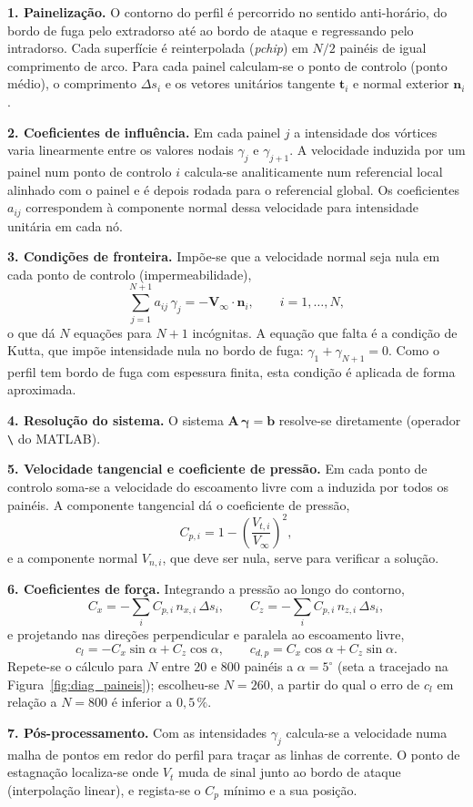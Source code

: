 \noindent\textbf{1. Painelização.} O contorno do perfil é percorrido no sentido
anti-horário, do bordo de fuga pelo extradorso até ao bordo de ataque e
regressando pelo intradorso. Cada superfície é reinterpolada (\emph{pchip}) em
$N/2$ painéis de igual comprimento de arco. Para cada painel calculam-se o ponto
de controlo (ponto médio), o comprimento $\Delta s_i$ e os vetores unitários
tangente $\mathbf{t}_i$ e normal exterior $\mathbf{n}_i$.

\noindent\textbf{2. Coeficientes de influência.} Em cada painel $j$ a intensidade dos
vórtices varia linearmente entre os valores nodais $\gamma_j$ e $\gamma_{j+1}$.
A velocidade induzida por um painel num ponto de controlo $i$ calcula-se
analiticamente num referencial local alinhado com o painel e é depois rodada para
o referencial global. Os coeficientes $a_{ij}$ correspondem à componente normal
dessa velocidade para intensidade unitária em cada nó.

\noindent\textbf{3. Condições de fronteira.} Impõe-se que a velocidade normal seja nula em
cada ponto de controlo (impermeabilidade),
\[
  \sum_{j=1}^{N+1} a_{ij}\,\gamma_j = -\mathbf{V}_\infty \cdot \mathbf{n}_i ,
  \qquad i = 1,\dots,N ,
\]
o que dá $N$ equações para $N+1$ incógnitas. A equação que falta é a condição de
Kutta, que impõe intensidade nula no bordo de fuga:
$\gamma_1 + \gamma_{N+1} = 0$. Como o perfil tem bordo de fuga com espessura
finita, esta condição é aplicada de forma aproximada.

\noindent\textbf{4. Resolução do sistema.} O sistema
$\mathbf{A}\,\boldsymbol{\gamma} = \mathbf{b}$ resolve-se diretamente
(operador \texttt{\textbackslash} do MATLAB).

\noindent\textbf{5. Velocidade tangencial e coeficiente de pressão.} Em cada ponto de
controlo soma-se a velocidade do escoamento livre com a induzida por todos os
painéis. A componente tangencial dá o coeficiente de pressão,
\[
  C_{p,i} = 1 - \left(\frac{V_{t,i}}{V_\infty}\right)^2 ,
\]
e a componente normal $V_{n,i}$, que deve ser nula, serve para verificar a
solução.

\noindent\textbf{6. Coeficientes de força.} Integrando a pressão ao longo do contorno,
\[
  C_x = -\sum_i C_{p,i}\, n_{x,i}\,\Delta s_i , \qquad
  C_z = -\sum_i C_{p,i}\, n_{z,i}\,\Delta s_i ,
\]
e projetando nas direções perpendicular e paralela ao escoamento livre,
\[
  c_l = -C_x \sin\alpha + C_z \cos\alpha , \qquad
  c_{d,p} = C_x \cos\alpha + C_z \sin\alpha .
\]
Repete-se o cálculo para $N$ entre $20$ e $800$ painéis a $\alpha = 5^\circ$
(seta a tracejado na Figura~\ref{fig:diag_paineis}); escolheu-se $N = 260$, a
partir do qual o erro de $c_l$ em relação a $N = 800$ é inferior a $0{,}5\,\%$.

\noindent\textbf{7. Pós-processamento.} Com as intensidades $\gamma_j$ calcula-se a
velocidade numa malha de pontos em redor do perfil para traçar as linhas de
corrente. O ponto de estagnação localiza-se onde $V_t$ muda de sinal junto ao
bordo de ataque (interpolação linear), e regista-se o $C_p$ mínimo e a sua
posição.
